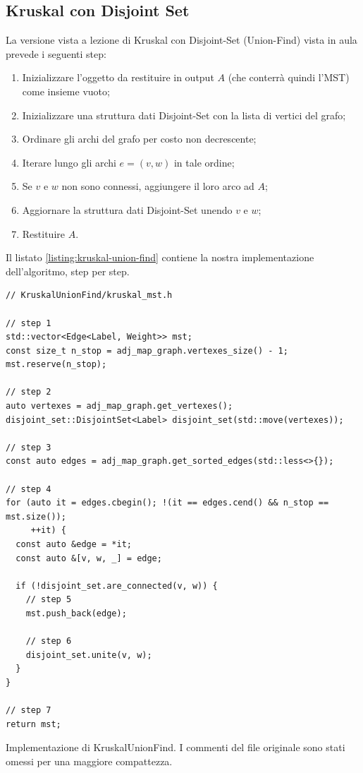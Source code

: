 \subsection{Kruskal con Disjoint Set}

La versione vista a lezione di Kruskal con Disjoint-Set (Union-Find) vista in aula prevede i seguenti step:

\begin{enumerate}
    \item Inizializzare l'oggetto da restituire in output $A$ (che conterrà quindi l'MST) come insieme vuoto;
    \item Inizializzare una struttura dati Disjoint-Set con la lista di vertici del grafo;
    \item Ordinare gli archi del grafo per costo non decrescente;
    \item Iterare lungo gli archi $e = (v, w)$ in tale ordine;
    \item Se $v$ e $w$ non sono connessi, aggiungere il loro arco ad $A$;
    \item Aggiornare la struttura dati Disjoint-Set unendo $v$ e $w$;
    \item Restituire $A$.
\end{enumerate}

\noindent Il listato \ref{listing:kruskal-union-find} contiene la nostra implementazione dell'algoritmo, step per step.

\begin{listing}[!ht]
\begin{verbatim}
// KruskalUnionFind/kruskal_mst.h

// step 1
std::vector<Edge<Label, Weight>> mst;
const size_t n_stop = adj_map_graph.vertexes_size() - 1;
mst.reserve(n_stop);

// step 2
auto vertexes = adj_map_graph.get_vertexes();
disjoint_set::DisjointSet<Label> disjoint_set(std::move(vertexes));

// step 3
const auto edges = adj_map_graph.get_sorted_edges(std::less<>{});

// step 4
for (auto it = edges.cbegin(); !(it == edges.cend() && n_stop == mst.size());
     ++it) {
  const auto &edge = *it;
  const auto &[v, w, _] = edge;

  if (!disjoint_set.are_connected(v, w)) {
    // step 5
    mst.push_back(edge);
    
    // step 6
    disjoint_set.unite(v, w);
  }
}

// step 7
return mst;
\end{verbatim}
\caption{Implementazione di KruskalUnionFind. I commenti del file originale sono stati omessi per una maggiore compattezza.}
\label{listing:kruskal-union-find}
\end{listing}

